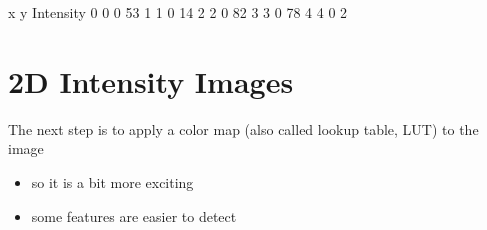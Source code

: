 \documentclass[letterpaper,10pt,english]{sphinxmanual}
\begin{document}
\begin{sphinxVerbatim}[commandchars=\\\{\}]
   x  y  Intensity
0  0  0         53
1  1  0         14
2  2  0         82
3  3  0         78
4  4  0          2
\end{sphinxVerbatim}

\begin{sphinxVerbatim}[commandchars=\\\{\}]
   
   
\end{sphinxVerbatim}

\noindent{}


\section{2D Intensity Images}
\label{\detokenize{01-Introduction:d-intensity-images}}
\sphinxAtStartPar
The next step is to apply a color map (also called lookup table, LUT) to the image
\begin{itemize}
\item {} 
\sphinxAtStartPar
so it is a bit more exciting

\item {} 
\sphinxAtStartPar
some features are easier to detect 

\end{itemize}
\end{document}
